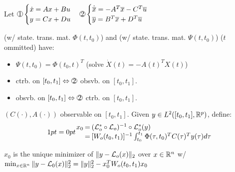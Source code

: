 \begin{minipage}{0.8\columnwidth}
Let $\circled{1}\begin{cases}
\dot x=Ax+Bu \\
y=Cx+Du
\end{cases}\circled{2}\begin{cases}
\dot{\overline x}=-A^T\overline x-C^T\overline u \\
\overline y=B^T\overline x+D^T\overline u
\end{cases}$

\begin{Theorem}
 (w/ state. trans. mat. $\Phi(t,t_0)$) and  (w/ state. trans. mat. $\Psi(t,t_0)$) ($t$ ommitted) have:
\begin{itemize}[leftmargin=3mm]
  \item \hspace{-1mm}$\Psi(t,t_0)=\Phi(t_0,t)^T$ (solve $\dot X(t)=-A(t)^TX(t)$)
  \item \hspace{-1mm} ctrb. on $[t_0,t_1]\Leftrightarrow\circled{2}$ obsvb. on $[t_0,t_1]$.
  \item \hspace{-1mm} obsvb. on $[t_0,t_1]\Leftrightarrow\circled{2}$ ctrb. on $[t_0,t_1]$.
\end{itemize}
\end{Theorem}
\begin{Theorem}
$(C(\cdot),A(\cdot))$ observable on $[t_0,t_1]$. Given $y\in L^2([t_0,t_1],\mathbb R^p)$, define:
\begin{equation*}
\arraycolsep=0pt
\begin{array}{rcl}
x_0 & = &
(\mathcal L_o^*\circ\mathcal L_o)^{-1}\circ\mathcal L_o^*(y) \\
& = &
[W_o(t_0,t_1)]^{-1}\int_{t_0}^{t_1}\Phi(\tau,t_0)^TC(\tau)^Ty(\tau)d\tau
\end{array}
\end{equation*}
\end{Theorem}
\end{minipage}
\vspace{-0.5mm}
\begin{Theorem}
$x_0$ is the unique minimizer of $\|y-\mathcal L_o(x)\|_{2}$ over $x\in\mathbb R^n$ w/ $\min_{x\in\mathbb R^n}\|y-\mathcal L_0(x)\|_{2}^2=\|y\|_{2}^2-x_0^TW_o(t_0,t_1)x_0$
\end{Theorem}




